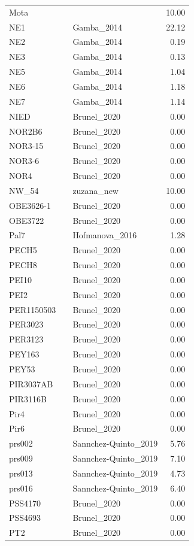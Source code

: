 \begin{longtable}[t]{lllr}
Mota &  &  & 10.00\\
NE1 &  & Gamba\_2014 & 22.12\\
NE2 &  & Gamba\_2014 & 0.19\\
NE3 &  & Gamba\_2014 & 0.13\\
NE5 &  & Gamba\_2014 & 1.04\\
NE6 &  & Gamba\_2014 & 1.18\\
NE7 &  & Gamba\_2014 & 1.14\\
NIED &  & Brunel\_2020 & 0.00\\
NOR2B6 &  & Brunel\_2020 & 0.00\\
NOR3-15 &  & Brunel\_2020 & 0.00\\
NOR3-6 &  & Brunel\_2020 & 0.00\\
NOR4 &  & Brunel\_2020 & 0.00\\
NW\_54 &  & zuzana\_new & 10.00\\
OBE3626-1 &  & Brunel\_2020 & 0.00\\
OBE3722 &  & Brunel\_2020 & 0.00\\
Pal7 &  & Hofmanova\_2016 & 1.28\\
PECH5 &  & Brunel\_2020 & 0.00\\
PECH8 &  & Brunel\_2020 & 0.00\\
PEI10 &  & Brunel\_2020 & 0.00\\
PEI2 &  & Brunel\_2020 & 0.00\\
PER1150503 &  & Brunel\_2020 & 0.00\\
PER3023 &  & Brunel\_2020 & 0.00\\
PER3123 &  & Brunel\_2020 & 0.00\\
PEY163 &  & Brunel\_2020 & 0.00\\
PEY53 &  & Brunel\_2020 & 0.00\\
PIR3037AB &  & Brunel\_2020 & 0.00\\
PIR3116B &  & Brunel\_2020 & 0.00\\
Pir4 &  & Brunel\_2020 & 0.00\\
Pir6 &  & Brunel\_2020 & 0.00\\
prs002 &  & Sannchez-Quinto\_2019 & 5.76\\
prs009 &  & Sannchez-Quinto\_2019 & 7.10\\
prs013 &  & Sannchez-Quinto\_2019 & 4.73\\
prs016 &  & Sannchez-Quinto\_2019 & 6.40\\
PSS4170 &  & Brunel\_2020 & 0.00\\
PSS4693 &  & Brunel\_2020 & 0.00\\
PT2 &  & Brunel\_2020 & 0.00\\

\end{longtable}
